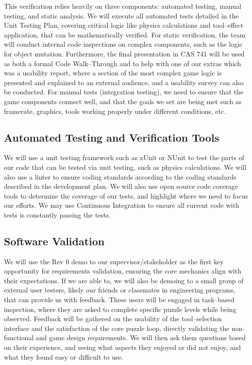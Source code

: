 \documentclass[12pt, titlepage]{article}
\begin{document}
This verification relies heavily on three components: automated testing, manual testing, and static analysis. We will execute all automated tests detailed in the Unit Testing Plan, covering critical logic like physics calculations and tool--effect application, that can be mathematically verified. For static verification, the team will conduct internal code inspections on complex components, such as the logic for object mutation. Furthermore, the final presentation in CAS 741 will be used as both a formal Code Walk--Through and to help with one of our extras which was a usability report, where a section of the most complex game logic is presented and explained to an external audience, and a usability survey can also be conducted. For manual tests (integration testing), we need to ensure that the game components connect well, and that the goals we set are being met such as framerate, graphics, tools working properly under different conditions, etc.

\subsection{Automated Testing and Verification Tools}

We will use a unit testing framework such as xUnit or NUnit to test the parts of our code that can be tested via unit testing, such as physics calculations. We will also use a linter to ensure coding standards according to the coding standards described in the development plan. We will also use open source code coverage tools to determine the coverage of our tests, and highlight where we need to focus our efforts. We may use Continuous Integration to ensure all current code with tests is constantly passing the tests.

\subsection{Software Validation}

We will use the Rev 0 demo to our supervisor/stakeholder as the first key opportunity for requirements validation, ensuring the core mechanics align with their expectations. If we are able to, we will also be demoing to a small group of external user testers, likely our friends or classmates in engineering programs, that can provide us with feedback. These users will be engaged in task--based inspection, where they are asked to complete specific puzzle levels while being observed. Feedback will be gathered on the usability of the tool--selection interface and the satisfaction of the core puzzle loop, directly validating the non--functional and game design requirements. We will then ask them questions based on their experience, and seeing what aspects they enjoyed or did not enjoy, and what they found easy or difficult to use.
\end{document}
